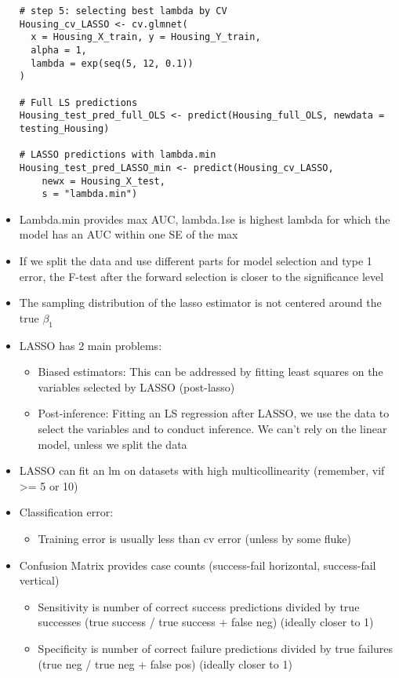 \documentclass[8pt,landscape,a4paper, fleqn, dvipsnames]{extarticle}
\begin{document}
\begin{multicols*}{4}
\begin{itemize}
\begin{lstlisting}
# step 5: selecting best lambda by CV
Housing_cv_LASSO <- cv.glmnet(
  x = Housing_X_train, y = Housing_Y_train,
  alpha = 1,
  lambda = exp(seq(5, 12, 0.1))
)

# Full LS predictions
Housing_test_pred_full_OLS <- predict(Housing_full_OLS, newdata = testing_Housing)

# LASSO predictions with lambda.min
Housing_test_pred_LASSO_min <- predict(Housing_cv_LASSO, 
    newx = Housing_X_test, 
    s = "lambda.min")
    \end{lstlisting}
    \item Lambda.min provides max AUC, lambda.1se is highest lambda for which the model has an AUC within one SE of the max
    \item If we split the data and use different parts for model selection and type 1 error, the F-test after the forward selection is closer to the significance level
    \item The sampling distribution of the lasso estimator is not centered around the true $\beta_1$
    \item LASSO has 2 main problems:
    \begin{itemize}
        \item Biased estimators: This can be addressed by fitting least squares on the variables selected by LASSO (post-lasso)
        \item Post-inference: Fitting an LS regression after LASSO, we use the data to select the variables and to conduct inference. We can't rely on the linear model, unless we split the data
    \end{itemize}
    \item LASSO can fit an lm on datasets with high multicollinearity (remember, vif >= 5 or 10)
    \item Classification error:
    \begin{itemize}
        \item Training error is usually less than cv error (unless by some fluke)
    \end{itemize}
    \item Confusion Matrix provides case counts (success-fail horizontal, success-fail vertical)
    \begin{itemize}
        \item Sensitivity is number of correct success predictions divided by true successes (true success / true success + false neg) (ideally closer to 1)
        \item Specificity is number of correct failure predictions divided by true failures (true neg / true neg + false pos) (ideally closer to 1)

\end{itemize}
\end{itemize}
\end{multicols*}
\end{document}

